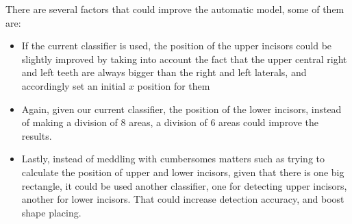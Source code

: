There are several factors that could improve the automatic model, some of them
are:
\begin{itemize}
  \item If the current classifier is used, the position of the upper incisors
could be slightly improved by taking into account the fact that the upper
central right and left teeth are always bigger than the right and left laterals,
and accordingly set an initial $x$ position for them
  \item Again, given our current classifier, the position of the lower
incisors, instead of making a division of 8 areas, a division of 6 areas could
improve the results.
  \item Lastly, instead of meddling with cumbersomes matters such as trying to
calculate the position of upper and lower incisors, given that there is one big
rectangle, it could be used another classifier, one for detecting upper
incisors, another for lower incisors. That could increase detection accuracy,
and boost shape placing.
\end{itemize}

